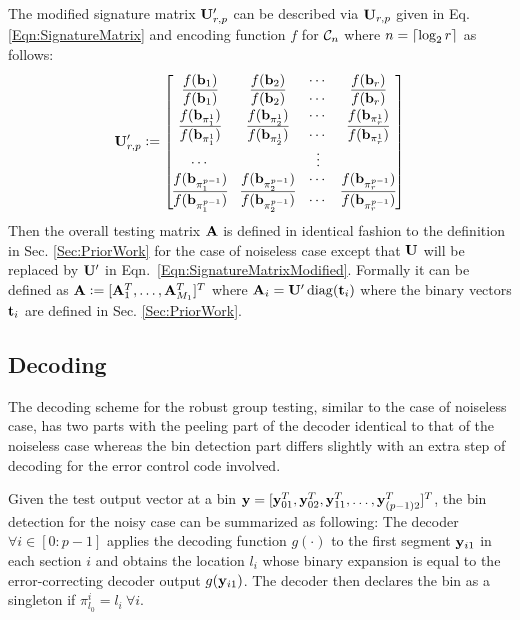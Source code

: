 The modified signature matrix $\mathbf{U}'_{r,p}$ can be described via $\mathbf{U}_{r, p}$ given in Eq. \eqref{Eqn:SignatureMatrix} and encoding function $f$ for $\mathcal{C}_n$ where $n=\lceil{\log_2 r}\rceil$ as follows:
 \begin{align}
\label{Eqn:SignatureMatrixModified}
\mathbf{U}_{r,p}'\mathrel{\mathop:}=\begin{bmatrix}
f(\mathbf{b}_1)  & f(\mathbf{b}_2) &\cdots & f(\mathbf{b}_r) \\
\overline{f(\mathbf{b}_1)} & \overline{f(\mathbf{b}_2)} & \cdots & \overline{f(\mathbf{b}_r)}\\
f(\mathbf{b}_{\pi^{1}_{1}}) & f(\mathbf{b}_{\pi^{1}_{2}}) & \cdots & f(\mathbf{b}_{\pi^{1}_{r}})\\
\overline{f(\mathbf{b}_{\pi^{1}_{1}})} & \overline{f(\mathbf{b}_{\pi^{1}_{2}})} & \cdots & \overline{f(\mathbf{b}_{\pi^{1}_{r}})}\\
\cdots &  &\vdots \\
f(\mathbf{b}_{\pi^{p-1}_{1}}) & f(\mathbf{b}_{\pi^{p-1}_{2}}) & \cdots & f(\mathbf{b}_{\pi^{p-1}_{r}})\\
\overline{f(\mathbf{b}_{\pi^{p-1}_{1}})} & \overline{f(\mathbf{b}_{\pi^{p-1}_{2}})} & \cdots & \overline{f(\mathbf{b}_{\pi^{p-1}_{r}})}\\
\end{bmatrix}
\end{align}  
Then the overall testing matrix $\mathbf{A}$ is defined in identical fashion to the definition in Sec. \ref{Sec:PriorWork} for the case of noiseless case except that $\mathbf{U}$ will be replaced by $\mathbf{U'}$ in Eqn.~\eqref{Eqn:SignatureMatrixModified}. Formally it can be defined as $\mathbf{A}\mathrel{\mathop:}= [\mathbf{A}_{1}^{T},\ldots,\mathbf{A}_{M_{1}}^{T}]^T$ where $\mathbf{A}_{i}=\mathbf{U'} \operatorname{diag} (\mathbf{t}_i)$ where the binary vectors $\mathbf{t}_i$ are defined in Sec. \ref{Sec:PriorWork}. 

\subsection*{Decoding}
The decoding scheme for the robust group testing, similar to the case of noiseless case, has two parts with the peeling part of the decoder identical to that of the noiseless case whereas the bin detection part differs slightly with an extra step of decoding for the error control code involved.

Given the test output vector at a bin $\mathbf{y}=[\mathbf{y}^{T}_{01},\mathbf{y}^{T}_{02},\mathbf{y}^{T}_{11},\ldots,\mathbf{y}^{T}_{(p-1)2}]^T$, the bin detection for the noisy case can be summarized as following: The decoder $\forall i\in[0:p-1]$ applies the decoding function $g(\cdot)$ to the first segment $\mathbf{y}_{i1}$ in each section $i$ and obtains the location $l_i$ whose binary expansion is equal to the error-correcting decoder output  $g(\mathbf{y}_{i1})$. The decoder then declares the bin as a singleton if $\pi_{l_0}^{i}=l_i~\forall i$.

